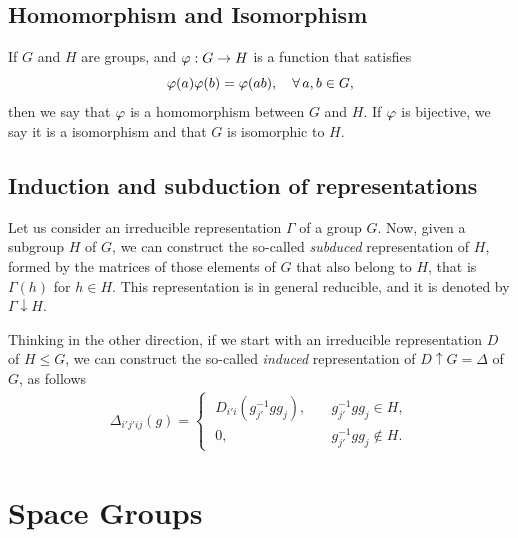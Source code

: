 \subsection{Homomorphism and Isomorphism}

If $G$ and $H$ are groups, and $\varphi: G \to H$ is a function that satisfies
$$
\varphi(a)\varphi(b) = \varphi(ab), \quad \forall \, a,b \in G,
$$
then we say that $\varphi$ is a homomorphism between $G$ and $H$. If $\varphi$ is bijective, we say it is a isomorphism and that $G$ is isomorphic to $H$.

\subsection{Induction and subduction of representations}

Let us consider an irreducible representation $\Gamma$ of a group $G$. Now, given a subgroup $H$ of $G$, we can construct the so-called \textit{subduced} representation of $H$, formed by the matrices of those elements of $G$ that also belong to $H$, that is $\Gamma(h)$ for $h \in H$. This representation is in general reducible, and it is denoted by $\Gamma \downarrow H$.

Thinking in the other direction, if we start with an irreducible representation $D$ of $H \leq G$, we can construct the so-called \textit{induced} representation of $D \uparrow G = \Delta$ of $G$, as follows
\begin{align*}
\Delta_{i'j'ij}(g) =
\begin{cases}
\; D_{i'i}(g_{j'}^{-1} g g_j), \quad & g_{j'}^{-1} g g_j \in H, \\
\; 0,  & g_{j'}^{-1} g g_j \notin H.
\end{cases}
\end{align*}

\section{Space Groups}

